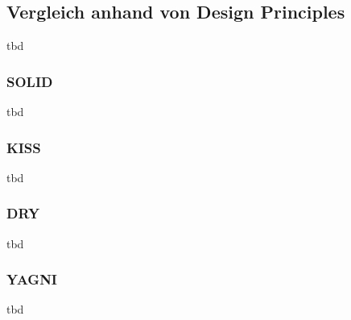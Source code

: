 \subsection{Vergleich anhand von Design Principles}
\color{red}
tbd
\color{black}

\subsubsection{SOLID}
\color{red}
tbd
\color{black}

\subsubsection{KISS}
\color{red}
tbd
\color{black}

\subsubsection{DRY}
\color{red}
tbd
\color{black}

\subsubsection{YAGNI}
\color{red}
tbd
\color{black}

